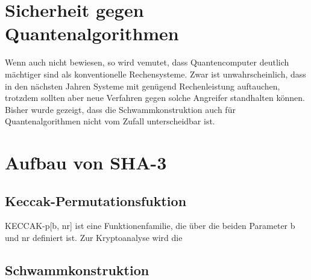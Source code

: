 \documentclass{article}
\begin{document}
\section{Sicherheit gegen Quantenalgorithmen}
Wenn auch nicht bewiesen, so wird vemutet, dass Quantencomputer deutlich mächtiger sind als konventionelle Rechensysteme. Zwar ist unwahrscheinlich, dass in den nächsten Jahren Systeme mit genügend Rechenleistung auftauchen,
trotzdem sollten aber neue Verfahren gegen solche Angreifer standhalten können. Bisher wurde gezeigt, dass die Schwammkonstruktion auch für Quantenalgorithmen nicht vom Zufall unterscheidbar ist.

\section{Aufbau von SHA-3}
\subsection{Keccak-Permutationsfuktion}
KECCAK-p[b, nr] ist eine Funktionenfamilie, die über die beiden Parameter b und nr definiert ist. Zur Kryptoanalyse wird die 

\subsection{Schwammkonstruktion}
\end{document}

